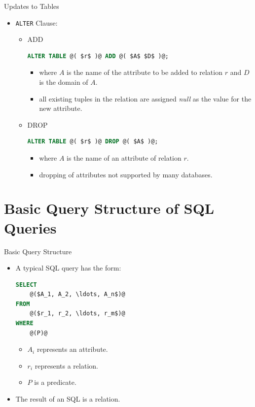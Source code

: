\documentclass{beamer}
\begin{document}
\begin{frame}[fragile]{Updates to Tables}
    \begin{itemize}
        \item \texttt{ALTER} Clause:
        \begin{itemize}
            \item ADD
                \begin{lstlisting}[language=SQL]
ALTER TABLE @( $r$ )@ ADD @( $A$ $D$ )@;
                \end{lstlisting}
                \begin{itemize}
                    \item where $A$ is the name of the attribute to be added to relation $r$ and $D$ is the domain of $A$.
                    \item all existing tuples in the relation are assigned \textit{null} as the value for the new attribute.
                \end{itemize}
            \item DROP
                \begin{lstlisting}[language=SQL]
ALTER TABLE @( $r$ )@ DROP @( $A$ )@;
                \end{lstlisting}
                \begin{itemize}
                    \item where $A$ is the name of an attribute of relation $r$.
                    \item dropping of attributes not supported by many databases.
                \end{itemize}
        \end{itemize}
    \end{itemize}
\end{frame}

\section{Basic Query Structure of SQL Queries}

\begin{frame}[fragile]{Basic Query Structure}
    \begin{itemize}
        \item A typical SQL query has the form:
        \begin{lstlisting}[language=SQL]
SELECT
    @($A_1, A_2, \ldots, A_n$)@
FROM
    @($r_1, r_2, \ldots, r_m$)@
WHERE
    @(P)@
        \end{lstlisting}
        \begin{itemize}
            \item $A_i$ represents an attribute.
            \item $r_i$ represents a relation.
            \item $P$ is a predicate.
        \end{itemize}
        \item The result of an SQL is a relation.
    \end{itemize}
\end{frame}
\end{document}
